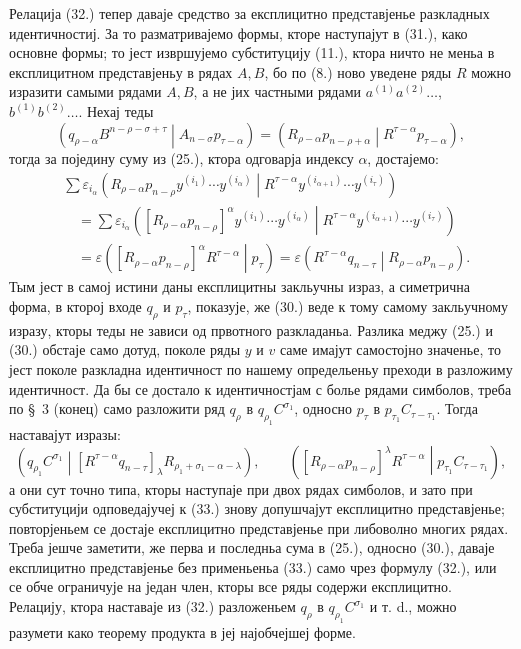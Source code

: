 ﻿\documentclass[11pt]{article}
\newcommand{\pair}[2]{\left(#1\middle|#2\right)}
\newcommand{\eps}{\varepsilon}
\begin{document}
Релација (32.) тепер даваје средство за експлицитно представјенье разкладных идентичностиј. За то разматривајемо формы, кторе наступајут в (31.), како основне формы; то јест извршујемо субституцију (11.), ктора ничто не меньа в експлицитном представјеньу в рядах $A,B$, бо по (8.) ново уведене ряды $R$ можно изразити самыми рядами $A,B$, а не јих частными рядами $a^{(1)}a^{(2)}\ldots$, $b^{(1)}b^{(2)}\ldots$. Нехај теды
\begin{equation}
 \pair{q_{\rho-\alpha}B^{n-\rho-\sigma+\tau}}{A_{n-\sigma}p_{\tau-\alpha}}
 =\pair{R_{\rho-\alpha}p_{n-\rho+\alpha}}{R^{\tau-\alpha}p_{\tau-\alpha}},
\tag{33}
\end{equation}
тогда за поједину суму из (25.), ктора одговарја индексу $\alpha$, достајемо:
\begin{equation}
\begin{aligned}
&\sum \eps_{i_\alpha}
\pair{R_{\rho-\alpha}p_{n-\rho}y^{(i_1)}\cdots y^{(i_\alpha)}}
{R^{\tau-\alpha}y^{(i_{\alpha+1})}\cdots y^{(i_\tau)}}\\
&\quad=\sum \eps_{i_\alpha}
\pair{[R_{\rho-\alpha}p_{n-\rho}]^\alpha
y^{(i_1)}\cdots y^{(i_\alpha)}}
{R^{\tau-\alpha}y^{(i_{\alpha+1})}\cdots y^{(i_\tau)}}\\
&\quad=\eps\pair{[R_{\rho-\alpha}p_{n-\rho}]^\alpha R^{\tau-\alpha}}{p_\tau}
 =\eps\pair{R^{\tau-\alpha}q_{n-\tau}}{R_{\rho-\alpha}p_{n-\rho}}.
\end{aligned}
\tag{34}
\end{equation}
Тым јест в самој истини даны експлицитны закльучны израз, а симетрична форма, в кторој входе $q_\rho$ и $p_\tau$, показује, же (30.) веде к тому самому закльучному изразу, кторы теды не зависи од првотного разкладаньа. Разлика меджу (25.) и (30.) обстаје само дотуд, поколе ряды $y$ и $v$ саме имајут самостојно значенье, то јест поколе разкладна идентичност по нашему определьеньу преходи в разложиму идентичност. Да бы се достало к идентичностјам с болье рядами симболов, треба по \S\ 3 (конец) само разложити ряд $q_\rho$ в $q_{\rho_1}C^{\sigma_1}$, односно $p_\tau$ в $p_{\tau_1}C_{\tau-\tau_1}$. Тогда наставајут изразы:
\begin{equation}
 \pair{q_{\rho_1}C^{\sigma_1}}
 {[R^{\tau-\alpha}q_{n-\tau}]_\lambda R_{\rho_1+\sigma_1-\alpha-\lambda}},
 \qquad
 \pair{[R_{\rho-\alpha}p_{n-\rho}]^\lambda R^{\tau-\alpha}}
 {p_{\tau_1}C_{\tau-\tau_1}},
\tag{35}
\end{equation}
а они сут точно типа, кторы наступаје при двох рядах симболов, и зато при субституцији одповедајучеј к (33.) знову допушчајут експлицитно представјенье; повторјеньем се достаје експлицитно представјенье при либоволно многих рядах. Треба јешче заметити, же перва и последньа сума в (25.), односно (30.), даваје експлицитно представјенье без применьеньа (33.) само чрез формулу (32.), или се обче ограничује на један член, кторы все ряды содержи експлицитно. Релацију, ктора наставаје из (32.) разложеньем $q_\rho$ в $q_{\rho_1}C^{\sigma_1}$ и т. d., можно разумети како теорему продукта в јеј најобчејшеј форме.
\end{document}
